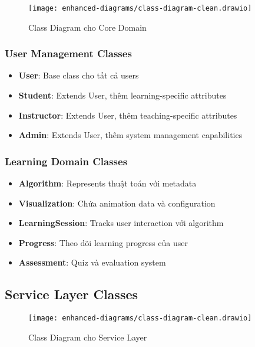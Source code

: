 \begin{figure}[H]
\centering
\texttt{[image: enhanced-diagrams/class-diagram-clean.drawio]}
\caption{Class Diagram cho Core Domain}
\label{fig:class-core}
\end{figure}

\subsubsection{User Management Classes}

\begin{itemize}
    \item \textbf{User}: Base class cho tất cả users
    \item \textbf{Student}: Extends User, thêm learning-specific attributes
    \item \textbf{Instructor}: Extends User, thêm teaching-specific attributes  
    \item \textbf{Admin}: Extends User, thêm system management capabilities
\end{itemize}

\subsubsection{Learning Domain Classes}

\begin{itemize}
    \item \textbf{Algorithm}: Represents thuật toán với metadata
    \item \textbf{Visualization}: Chứa animation data và configuration
    \item \textbf{LearningSession}: Tracks user interaction với algorithm
    \item \textbf{Progress}: Theo dõi learning progress của user
    \item \textbf{Assessment}: Quiz và evaluation system
\end{itemize}

\subsection{Service Layer Classes}
\label{subsec:service-classes}

\begin{figure}[H]
\centering
\texttt{[image: enhanced-diagrams/class-diagram-clean.drawio]}
\caption{Class Diagram cho Service Layer}
\label{fig:class-services}
\end{figure}

